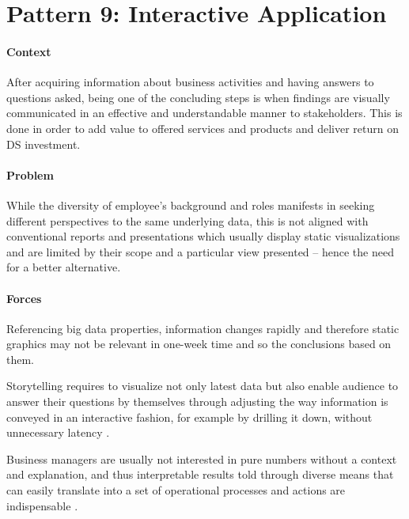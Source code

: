 \section{Pattern 9: Interactive Application}

\paragraph*{Context}
After acquiring information about business activities and having answers to questions asked, being one of the concluding steps is when findings are visually communicated in an effective and understandable manner to stakeholders. 
This is done in order to add value to offered services and products and deliver return on \ac{DS} investment.

\paragraph*{Problem}
While the diversity of employee's background and roles manifests in seeking different perspectives to the same underlying data, this is not aligned with conventional reports and presentations which usually display static visualizations and are limited by their scope and a particular view presented -- hence the need for a better alternative.

\paragraph*{Forces}
\begin{compactitem}
  \item Referencing big data properties, information changes rapidly and therefore static graphics may not be relevant in one-week time and so the conclusions based on them. 
  \item Storytelling requires to visualize not only latest data but also enable audience to answer their questions by themselves through adjusting the way information is conveyed in an interactive fashion, for example by drilling it down, without unnecessary latency \parencite{TabPatriVisual2015}.
  \item Business managers are usually not interested in pure numbers without a context and explanation, and thus interpretable results told through diverse means that can easily translate into a set of operational processes and actions are indispensable \parencite{FosterProvost2013DataThinking}.
\end{compactitem} 

